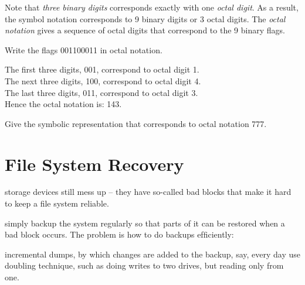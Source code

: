 \frmrule


Note that \textit{three binary digits} corresponds exactly with one \textit{octal digit}. 
As a result, the symbol notation corresponds to 9 binary digits or 3 octal digits. 
The \textit{octal notation} gives a sequence of octal digits that correspond to the 
9 binary flags. 

\frmrule

\begin{example}
Write the flags 001100011 in octal notation.

The first three digits, 001, correspond to octal digit 1. \\
The next three digits, 100, correspond to octal digit 4. \\
The last three digits, 011, correspond to octal digit 3. \\
Hence the octal notation is: 143.
\end{example}

\begin{example}
Give the symbolic representation that corresponds to octal notation 777.
\end{example}




\section{File System Recovery}

storage devices still mess up – they have
so-called bad blocks that make it hard to keep a ﬁle
system reliable.

simply backup the system regularly so that
parts of it can be restored when a bad block occurs.
The problem is how to do backups efﬁciently:

incremental dumps, by which changes are added
to the backup, say, every day
use doubling technique, such as doing writes to
two drives, but reading only from one.




